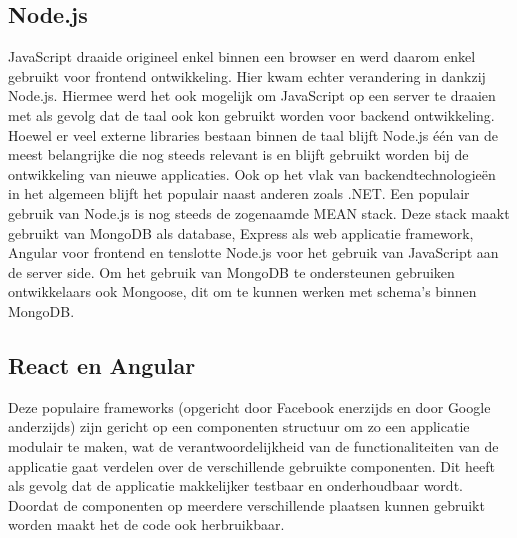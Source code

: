 \subsection{Node.js}
JavaScript draaide origineel enkel binnen een browser en werd daarom enkel gebruikt voor frontend ontwikkeling. Hier kwam echter verandering in dankzij Node.js. Hiermee werd het ook mogelijk om JavaScript op een server te draaien met als gevolg dat de taal ook kon gebruikt worden voor backend ontwikkeling. Hoewel er veel externe libraries bestaan binnen de taal blijft Node.js één van de meest belangrijke die nog steeds relevant is en blijft gebruikt worden bij de ontwikkeling van nieuwe applicaties. Ook op het vlak van backendtechnologieën in het algemeen blijft het populair naast anderen zoals .NET. Een populair gebruik van Node.js is nog steeds de zogenaamde MEAN stack. Deze stack maakt gebruikt van MongoDB als database, Express als web applicatie framework, Angular voor frontend en tenslotte Node.js voor het gebruik van JavaScript aan de server side. Om het gebruik van MongoDB te ondersteunen gebruiken ontwikkelaars ook Mongoose, dit om te kunnen werken met schema's binnen MongoDB.

\subsection{React en Angular}
Deze populaire frameworks (opgericht door Facebook enerzijds en door Google anderzijds) zijn gericht op een componenten structuur om zo een applicatie modulair te maken, wat de verantwoordelijkheid van de functionaliteiten van de applicatie gaat verdelen over de verschillende gebruikte componenten. Dit heeft als gevolg dat de applicatie makkelijker testbaar en onderhoudbaar wordt. Doordat de componenten op meerdere verschillende plaatsen kunnen gebruikt worden maakt het de code ook herbruikbaar. 

